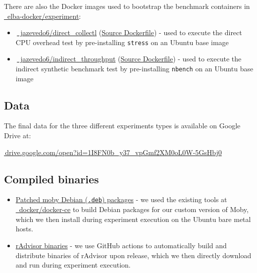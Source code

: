\documentclass[a4paper,11pt]{article}
\newcommand{\iconDocker}{\raisebox{-0.5ex}{{\iconsfont a}}\xspace}
\newcommand{\iconGoogleDrive}{\raisebox{-0.4ex}{{\iconsfont b}}\xspace}
\newcommand{\github}[2]{\,\href{https://github.com/#1/#2}{\faGithub~#1/\linebreak[0]#2}\xspace}
\newcommand{\dockerhub}[2]{\,\href{https://hub.docker.com/repository/docker/#1/#2}{\iconDocker~#1/\linebreak[0]#2}\xspace}
\begin{document}
There are also the Docker images used to bootstrap the benchmark containers in \github{elba-docker}{experiment}:

\vspace{-0.3em}
\begin{itemize}
    \item \dockerhub{jazevedo6}{direct\_collectl}
    (\href{https://github.com/elba-docker/experiment/blob/master/experiments/direct_collectl/scripts/Dockerfile}{Source Dockerfile}) -
    used to execute the direct CPU overhead test by pre-installing \texttt{stress} on an Ubuntu base image
    
    \item \dockerhub{jazevedo6}{indirect\_throughput}
    (\href{https://github.com/elba-docker/experiment/blob/master/experiments/indirect_throughput/scripts/Dockerfile}{Source Dockerfile}) -
    used to execute the indirect synthetic benchmark test by pre-installing \texttt{nbench} on an Ubuntu base image
\end{itemize}

\subsection{Data}
\vspace{0.75em}

The final data for the three different experiments types is available on Google Drive at:

\vspace{-0.75em}
\href{https://drive.google.com/open?id=1I8FN0b_y37_vpGmf2XM0oL0W-5GsHbj0}{
\iconGoogleDrive\,drive.google.com/open?id=1I8FN0b\_y37\_vpGmf2XM0oL0W-5GsHbj0}

\subsection{Compiled binaries}
\vspace{0.5em}

\begin{itemize}
    \item \href{https://github.com/elba-docker/experiment/tree/master/artifacts}{Patched moby Debian (\texttt{.deb}) packages} -
    we used the existing tools at \github{docker}{docker-ce}
    to build Debian packages for our custom version of Moby,
    which we then install during experiment execution on the Ubuntu bare metal hosts.
    
    \item \href{https://github.com/elba-docker/radvisor/releases}{rAdvisor binaries} -
    we use GitHub actions to automatically build and distribute binaries of rAdvisor upon release,
    which we then directly download and run during experiment execution.
\end{itemize}
\end{document}
